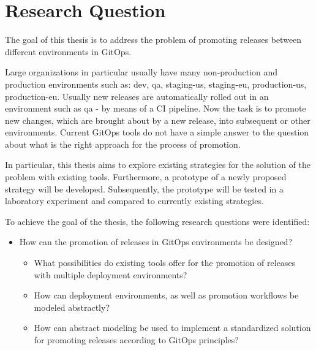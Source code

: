 \chapter{Research Question}

The goal of this thesis is to
address the problem of promoting releases between different environments in GitOps.
\bigskip

\noindent
Large organizations in particular usually have many
non-production and production environments
such as: dev, qa, staging-us, staging-eu, production-us, production-eu.
Usually new releases are automatically rolled out in an environment
such as qa - by means of a CI pipeline.
Now the task is to promote
new changes, which are brought about by a new release,
into subsequent or other environments.
Current GitOps tools do not have a simple answer to
the question about what is the right approach for the process of promotion.
\bigskip

\noindent
In particular, this thesis aims to explore
existing strategies for the solution of the problem
with existing tools.
Furthermore, a prototype of a newly proposed strategy will be developed.
Subsequently, the prototype will be tested in a laboratory experiment
and compared to currently existing strategies.
\bigskip



\noindent
To achieve the goal of the thesis, the following research questions were identified:

\begin{itemize}
	\item How can the promotion of releases in GitOps environments be designed?
	\begin{itemize}
		\item What possibilities do existing tools offer for the promotion of releases with multiple deployment environments?
		\item How can deployment environments, as well as promotion workflows be modeled abstractly?
		\item How can abstract modeling be used to implement a standardized solution for promoting releases according to GitOps principles?
	\end{itemize}
\end{itemize}

